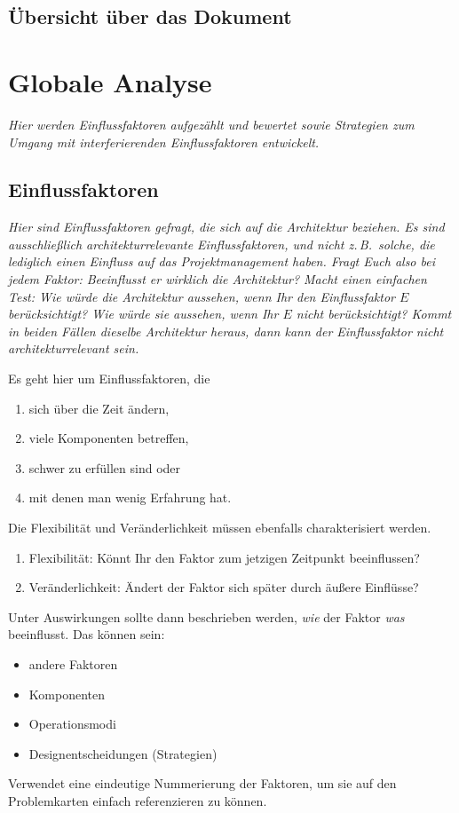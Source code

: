 \documentclass[fontsize=12pt,paper=a4,twoside]{scrartcl}
\begin{document}
\subsection{Übersicht über das Dokument}
\nurlangversion


\section{Globale Analyse} \label{sec:globale_analyse}

{ \em Hier werden Einflussfaktoren aufgezählt und bewertet sowie 
  Strategien zum Umgang mit interferierenden Einflussfaktoren 
  entwickelt.
}

\subsection{Einflussfaktoren} \label{sec:einflussfaktoren}
{ \em Hier sind Einflussfaktoren gefragt, die sich auf die Architektur
  beziehen. Es sind ausschließlich architekturrelevante 
  Einflussfaktoren, und nicht z.\,B.\ solche, die lediglich einen 
  Einfluss auf das Projektmanagement haben. Fragt Euch also bei jedem 
  Faktor: Beeinflusst er wirklich die Architektur? Macht einen 
  einfachen Test: Wie würde die Architektur aussehen, wenn Ihr den 
  Einflussfaktor $E$ berücksichtigt? Wie würde sie aussehen, wenn Ihr
  $E$ nicht berücksichtigt? Kommt in beiden Fällen dieselbe 
  Architektur heraus, dann kann der Einflussfaktor nicht 
  architekturrelevant sein.

  Es geht hier um Einflussfaktoren, die
  \begin{enumerate}
    \item sich über die Zeit ändern,
    \item viele Komponenten betreffen,
    \item schwer zu erfüllen sind oder
    \item mit denen man wenig Erfahrung hat.
  \end{enumerate}

  Die Flexibilität und Veränderlichkeit müssen ebenfalls 
  charakterisiert werden. 
  \begin{enumerate}
    \item Flexibilität: Könnt Ihr den Faktor zum jetzigen Zeitpunkt 
      beeinflussen?
    \item Veränderlichkeit: Ändert der Faktor sich später durch äußere 
      Einflüsse?
  \end{enumerate}

  Unter Auswirkungen sollte dann beschrieben werden, \emph{wie} der 
  Faktor \emph{was} beeinflusst. Das können sein:
  \begin{itemize}
    \item andere Faktoren
    \item Komponenten
    \item Operationsmodi
    \item Designentscheidungen (Strategien)
  \end{itemize}

  Verwendet eine eindeutige Nummerierung der Faktoren, um sie auf den 
  Problemkarten einfach referenzieren zu können.
}
\end{document}
